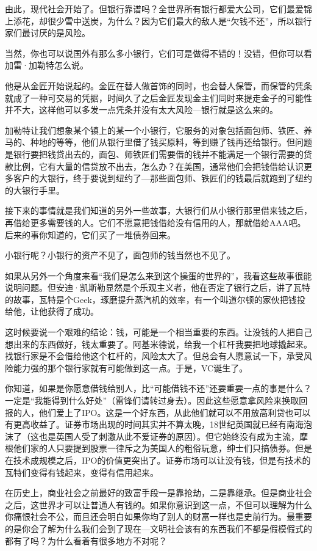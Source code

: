 由此，现代社会开始了。但银行靠谱吗？全世界所有银行都爱大公司，它们最爱锦上添花，却很少雪中送炭，为什么？因为它们最大的敌人是``欠钱不还''，所以银行家们最讨厌的是风险。

当然，你也可以说国外有那么多小银行，它们可是做得不错的！没错，但你可以看加雷·加勒特怎么说。

他是从金匠开始说起的。金匠在替人做首饰的同时，也会替人保管，而保管的凭条就成了一种可交易的凭据，时间久了之后金匠发现金主们同时来提走金子的可能性并不大，这样他可以多发一点凭条并没有太大风险---银行就是这么来的。

加勒特让我们想象某个镇上的某一个小银行，它服务的对象包括面包师、铁匠、养马的、种地的等等，他们从银行里借了钱买原料，等到赚了钱再还给银行。但问题是银行要把钱贷出去的，面包、师铁匠们需要借的钱并不能满足一个银行需要的贷款比例，它有大量的信贷放不出去，怎么办？在美国，通常他们会把钱借给认识更多客户的大银行，终于要说到纽约了---那些面包师、铁匠们的钱最后就跑到了纽约的大银行手里。

接下来的事情就是我们知道的另外一些故事，大银行们从小银行那里借来钱之后，再借给更多需要钱的人。它们不愿意把钱借给没有信用的人，那就借给AAA吧。后来的事你知道的，它们买了一堆债券回来。

小银行呢？小银行的资产不见了，面包师的钱当然也不见了。

如果从另外一个角度来看``我们是怎么来到这个操蛋的世界的''，我看这些故事很能说明问题。但安迪·凯斯勒显然是个乐观主义者，他在否定了银行之后，讲了瓦特的故事，瓦特是个Geek，琢磨提升蒸汽机的效率，有一个叫道尔顿的家伙把钱投给他，让他获得了成功。

这时候要说一个艰难的结论：钱，可能是一个相当重要的东西。让没钱的人把自己想出来的东西做好，钱太重要了。阿基米德说，给我一个杠杆我要把地球撬起来。找银行家是不会借给他这个杠杆的，风险太大了。但总会有人愿意试一下，承受风险能力强的那个银行家就有可能做到这一点。于是，VC诞生了。

你知道，如果是你愿意借钱给别人，比``可能借钱不还''还要重要一点的事是什么？一定是``我能得到什么好处''（雷锋们请转过身去）。因此这些愿意拿风险来换取回报的人，他们爱上了IPO。这是一个好东西，从此他们就可以不用放高利贷也可以有更高收益了。证券市场出现的时间其实并不算太晚，18世纪英国就已经有南海泡沫了（这也是英国人受了刺激从此不爱证券的原因）。但它始终没有成为主流，摩根他们家的人只要提到股票一律斥之为美国人的粗俗玩意，绅士们只搞债券。但是在技术成规模之后，IPO的价值更突出了。证券市场可以让没有钱，但是有技术的瓦特们变得有钱起来，变得有信用起来。

在历史上，商业社会之前最好的致富手段一是靠抢劫，二是靠继承。但是商业社会之后，这世界才可以让普通人有钱的。如果你意识到这一点，不但可以理解为什么你痛恨社会不公，而且还会明白如果你均了别人的财富一样也是史前行为。最重要的是你会了解为什么我们会到了现在---文明社会该有的东西我们不都是假模假式的都有了吗？为什么看着有很多地方不对呢？

